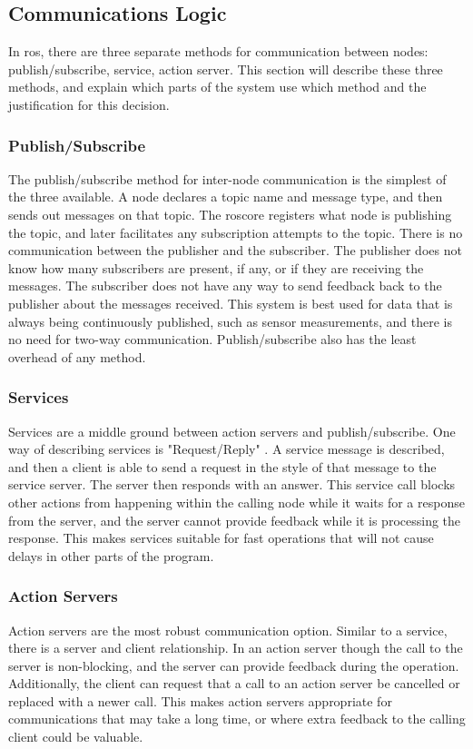 \documentclass[thesis.tex]{subfile}
\begin{document}
\subsection{Communications Logic}
In \gls{ros}, there are three separate methods for communication between nodes: publish/subscribe, service, action server. This section will describe these three methods, and explain which parts of the system use which method and the justification for this decision.

\subsubsection{Publish/Subscribe}
The publish/subscribe method for inter-node communication is the simplest of the three available. A node declares a topic name and message type, and then sends out messages on that topic. The \gls{roscore} registers what node is publishing the topic, and later facilitates any subscription attempts to the topic. There is no communication between the publisher and the subscriber. The publisher does not know how many subscribers are present, if any, or if they are receiving the messages. The subscriber does not have any way to send feedback back to the publisher about the messages received. This system is best used for data that is always being continuously published, such as sensor measurements, and there is no need for two-way communication. Publish/subscribe also has the least overhead of any method.

\subsubsection{Services}
Services are a middle ground between action servers and publish/subscribe. One way of describing services is "Request/Reply" \cite{RosServices}. A service message is described, and then a client is able to send a request in the style of that message to the service server. The server then responds with an answer. This service call blocks other actions from happening within the calling node while it waits for a response from the server, and the server cannot provide feedback while it is processing the response. This makes services suitable for fast operations that will not cause delays in other parts of the program.

\subsubsection{Action Servers}
Action servers are the most robust communication option. Similar to a service, there is a server and client relationship. In an action server though the call to the server is non-blocking, and the server can provide feedback during the operation. Additionally, the client can request that a call to an action server be cancelled or replaced with a newer call. This makes action servers appropriate for communications that may take a long time, or where extra feedback to the calling client could be valuable.
\end{document}
